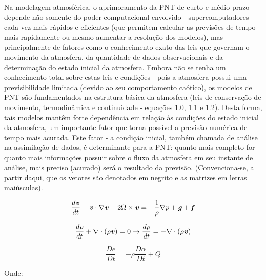 Na modelagem atmosférica, o aprimoramento da PNT de curto e médio prazo depende não somente do poder computacional envolvido - supercomputadores cada vez mais rápidos e eficientes (que permitem calcular as previsões de tempo mais rapidamente ou mesmo aumentar a resolução dos modelos), mas principalmente de fatores como o conhecimento exato das leis que governam o movimento da atmosfera, da quantidade de dados observacionais e da determinação do estado inicial da atmosfera.  Embora não se tenha um conhecimento total sobre estas leis e condições - pois a atmosfera possui uma previsibilidade limitada (devido ao seu comportamento caótico), os modelos de PNT são fundamentados na estrutura básica da atmosfera (leis de conservação de movimento, termodinâmica e continuidade - equações 1.0, 1.1 e 1.2). Desta forma, tais modelos mantêm forte dependência em relação às condições do estado inicial da atmosfera, um importante fator que torna possível a previsão numérica de tempo mais acurada. Este fator - a condição inicial, também chamada de análise na assimilação de dados, é determinante para a PNT: quanto mais completo for - quanto mais informações possuir sobre o fluxo da atmosfera em seu instante de análise, mais preciso (acurado) será o resultado da previsão. (Convenciona-se, a partir daqui, que os vetores são denotados em negrito e as matrizes em letras maiúsculas).

\begin{equation}
\frac{d\textbf{\textit{v}}}{dt}+\textbf{\textit{v}}\cdot\nabla\textbf{\textit{v}}+2\Omega\times\textbf{\textit{v}}=-\frac{1}{\rho}\nabla{p}+\textbf{\textit{g}}+\textbf{\textit{f}}
\label{form01}
\end{equation}

\begin{equation}
\frac{d\rho}{dt}+\nabla\cdot(\rho\textbf{\textit{v}})=0\rightarrow\frac{d\rho}{dt}=-\nabla\cdot(\rho\textbf{\textit{v}})
\label{form02}
\end{equation}

\begin{equation}
\frac{D\textit{e}}{D\textit{t}}=-\rho\frac{D\alpha}{D\textit{t}}+\textit{Q}
\label{form03}
\end{equation}

Onde:

